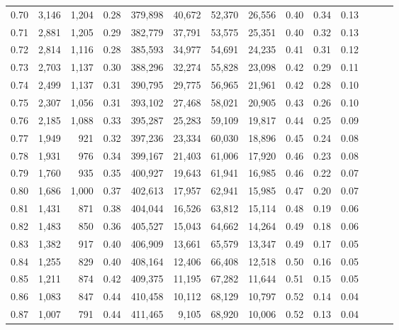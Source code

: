 \begin{tabular}{rrrrrrrrrrrrrr}
0.70 &   3,146 &  1,204 &  0.28 &  379,898 &   40,672 &  52,370 &  26,556 &  0.40 &  0.34 &      0.13 \\
0.71 &   2,881 &  1,205 &  0.29 &  382,779 &   37,791 &  53,575 &  25,351 &  0.40 &  0.32 &      0.13 \\
0.72 &   2,814 &  1,116 &  0.28 &  385,593 &   34,977 &  54,691 &  24,235 &  0.41 &  0.31 &      0.12 \\
0.73 &   2,703 &  1,137 &  0.30 &  388,296 &   32,274 &  55,828 &  23,098 &  0.42 &  0.29 &      0.11 \\
0.74 &   2,499 &  1,137 &  0.31 &  390,795 &   29,775 &  56,965 &  21,961 &  0.42 &  0.28 &      0.10 \\
0.75 &   2,307 &  1,056 &  0.31 &  393,102 &   27,468 &  58,021 &  20,905 &  0.43 &  0.26 &      0.10 \\
0.76 &   2,185 &  1,088 &  0.33 &  395,287 &   25,283 &  59,109 &  19,817 &  0.44 &  0.25 &      0.09 \\
0.77 &   1,949 &    921 &  0.32 &  397,236 &   23,334 &  60,030 &  18,896 &  0.45 &  0.24 &      0.08 \\
0.78 &   1,931 &    976 &  0.34 &  399,167 &   21,403 &  61,006 &  17,920 &  0.46 &  0.23 &      0.08 \\
0.79 &   1,760 &    935 &  0.35 &  400,927 &   19,643 &  61,941 &  16,985 &  0.46 &  0.22 &      0.07 \\
0.80 &   1,686 &  1,000 &  0.37 &  402,613 &   17,957 &  62,941 &  15,985 &  0.47 &  0.20 &      0.07 \\
0.81 &   1,431 &    871 &  0.38 &  404,044 &   16,526 &  63,812 &  15,114 &  0.48 &  0.19 &      0.06 \\
0.82 &   1,483 &    850 &  0.36 &  405,527 &   15,043 &  64,662 &  14,264 &  0.49 &  0.18 &      0.06 \\
0.83 &   1,382 &    917 &  0.40 &  406,909 &   13,661 &  65,579 &  13,347 &  0.49 &  0.17 &      0.05 \\
0.84 &   1,255 &    829 &  0.40 &  408,164 &   12,406 &  66,408 &  12,518 &  0.50 &  0.16 &      0.05 \\
0.85 &   1,211 &    874 &  0.42 &  409,375 &   11,195 &  67,282 &  11,644 &  0.51 &  0.15 &      0.05 \\
0.86 &   1,083 &    847 &  0.44 &  410,458 &   10,112 &  68,129 &  10,797 &  0.52 &  0.14 &      0.04 \\
0.87 &   1,007 &    791 &  0.44 &  411,465 &    9,105 &  68,920 &  10,006 &  0.52 &  0.13 &      0.04 \\

\end{tabular}
